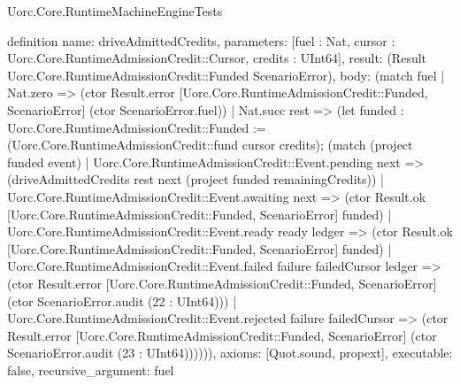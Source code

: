 \begin{lexlean}{Uorc.Core.RuntimeMachineEngineTests}
\begin{semanticmodule}
definition{
  name: driveAdmittedCredits,
  parameters: [fuel : Nat, cursor : Uorc.Core.RuntimeAdmissionCredit::Cursor, credits : UInt64],
  result: (Result Uorc.Core.RuntimeAdmissionCredit::Funded ScenarioError),
  body: (match fuel
    | Nat.zero => (ctor Result.error [Uorc.Core.RuntimeAdmissionCredit::Funded, ScenarioError] (ctor ScenarioError.fuel))
    | Nat.succ rest => (let funded : Uorc.Core.RuntimeAdmissionCredit::Funded := (Uorc.Core.RuntimeAdmissionCredit::fund cursor credits); (match (project funded event)
      | Uorc.Core.RuntimeAdmissionCredit::Event.pending next => (driveAdmittedCredits rest next (project funded remainingCredits))
      | Uorc.Core.RuntimeAdmissionCredit::Event.awaiting next => (ctor Result.ok [Uorc.Core.RuntimeAdmissionCredit::Funded, ScenarioError] funded)
      | Uorc.Core.RuntimeAdmissionCredit::Event.ready ready ledger => (ctor Result.ok [Uorc.Core.RuntimeAdmissionCredit::Funded, ScenarioError] funded)
      | Uorc.Core.RuntimeAdmissionCredit::Event.failed failure failedCursor ledger => (ctor Result.error [Uorc.Core.RuntimeAdmissionCredit::Funded, ScenarioError] (ctor ScenarioError.audit (22 : UInt64)))
      | Uorc.Core.RuntimeAdmissionCredit::Event.rejected failure failedCursor => (ctor Result.error [Uorc.Core.RuntimeAdmissionCredit::Funded, ScenarioError] (ctor ScenarioError.audit (23 : UInt64)))))),
  axioms: [Quot.sound, propext],
  executable: false,
  recursive_argument: fuel
}


\end{semanticmodule}
\end{lexlean}
